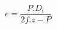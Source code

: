\documentclass[12pt]{article}
\begin{document}
\begin{displaymath}
e = \frac {P . D_i} {2f . z - P}
\end{displaymath}
\end{document}
